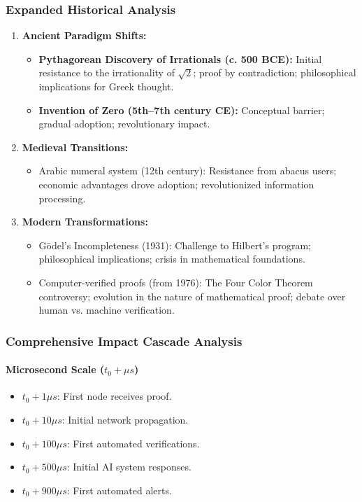 \documentclass[11pt]{article}
\begin{document}
\subsubsection{Expanded Historical Analysis}

\begin{enumerate}[label=(\arabic*)]
    \item \textbf{Ancient Paradigm Shifts:}
    \begin{itemize}
        \item \textbf{Pythagorean Discovery of Irrationals (c. 500 BCE):} Initial resistance to the irrationality of $\sqrt{2}$; proof by contradiction; philosophical implications for Greek thought.
        \item \textbf{Invention of Zero (5th--7th century CE):} Conceptual barrier; gradual adoption; revolutionary impact.
    \end{itemize}
    \item \textbf{Medieval Transitions:}
    \begin{itemize}
        \item Arabic numeral system (12th century): Resistance from abacus users; economic advantages drove adoption; revolutionized information processing.
    \end{itemize}
    \item \textbf{Modern Transformations:}
    \begin{itemize}
        \item Gödel's Incompleteness (1931): Challenge to Hilbert's program; philosophical implications; crisis in mathematical foundations.
        \item Computer-verified proofs (from 1976): The Four Color Theorem controversy; evolution in the nature of mathematical proof; debate over human vs. machine verification.
    \end{itemize}
\end{enumerate}

\subsubsection{Comprehensive Impact Cascade Analysis}

\paragraph{Microsecond Scale \quad ($t_0+\mu s$)}
\begin{itemize}
    \item $t_0+1\mu s$: First node receives proof.
    \item $t_0+10\mu s$: Initial network propagation.
    \item $t_0+100\mu s$: First automated verifications.
    \item $t_0+500\mu s$: Initial AI system responses.
    \item $t_0+900\mu s$: First automated alerts.
\end{itemize}
\end{document}
